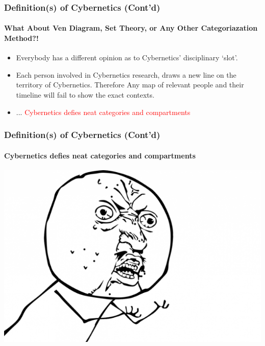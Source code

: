 		\begin{frame}
			\frametitle{Definition(s) of Cybernetics (Cont'd)}
			\framesubtitle{What About Ven Diagram, Set Theory, or Any Other Categoriazation Method?!}
			\begin{itemize}
				\item<1->Everybody has a different opinion as to Cybernetics' disciplinary `slot'.
				\item<2->Each person involved in Cybernetics research, draws a new line on the territory of Cybernetics. Therefore Any map of relevant people and their timeline will fail to show the exact contexts.
				\item<3->... \textcolor{red}{Cybernetics defies neat categories and compartments}
			\end{itemize}
		\end{frame}
	
		\begin{frame}
			\frametitle{Definition(s) of Cybernetics (Cont'd)}
			\framesubtitle{Cybernetics defies neat categories and compartments}
			\centering\includegraphics[height=0.7\textheight]{./resources/frustrated.png}
		\end{frame}

